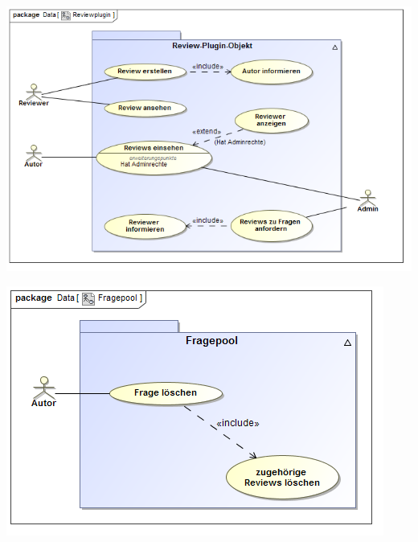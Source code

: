 \documentclass{beamer}
\begin{document}
		\begin{frame}
			\includegraphics[scale=0.45]{Diagramme/Use_Case_Diagram__Reviewplugin.png}
			\label{Reviewplugin}	
		\end{frame}
		\begin{frame}
			\includegraphics[scale=0.7]{Diagramme/Use_Case_Diagram__Fragepool.png}
				\label{Fragepool}
		\end{frame}
\end{document}
